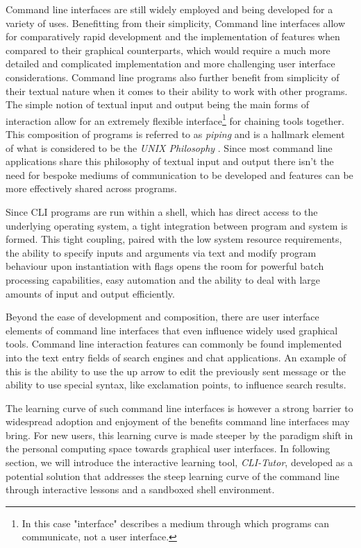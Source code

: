 Command line interfaces are still widely employed and being developed for a
variety of uses. Benefitting from their simplicity, Command line interfaces
allow for comparatively rapid development and the implementation of features
when compared to their graphical counterparts, which would require a much more
detailed and complicated implementation and more challenging user interface
considerations. Command line programs also further benefit from simplicity of
their textual nature when it comes to their ability to work with other
programs. The simple notion of textual input and output being the main forms of
interaction allow for an extremely flexible interface\footnote{In this case
	"interface" describes a medium through which programs can communicate, not
	a user interface.} for chaining tools together. This composition of programs is
referred to as \textit{piping} and is a hallmark element of what is considered to be the
\textit{UNIX Philosophy} \cite{mcilroy1978unix}. Since most command line
applications share this philosophy of textual input and output there isn't the
need for bespoke mediums of communication to be developed and features can be
more effectively shared across programs.

Since CLI programs are run within a shell, which has direct access to the
underlying operating system, a tight integration between program and system is
formed. This tight coupling, paired with the low system resource requirements,
the ability to specify inputs and arguments via text and modify program
behaviour upon instantiation with flags opens the room for powerful batch
processing capabilities, easy automation and the ability to deal with large
amounts of input and output efficiently.

Beyond the ease of development and composition, there are user interface
elements of command line interfaces that even influence widely used graphical
tools. Command line interaction features can commonly be found implemented into
the text entry fields of search engines \cite{norman2007breakthrough} and chat
applications. An example of this is the ability to use the up arrow to edit the
previously sent message or the ability to use special syntax, like exclamation
points, to influence search results.

The learning curve of such command line interfaces is however a strong barrier
to widespread adoption and enjoyment of the benefits command line interfaces
may bring. For new users, this learning curve is made steeper by the paradigm
shift in the personal computing space towards graphical user interfaces. In
following section, we will introduce the interactive learning tool,
\textit{CLI-Tutor}, developed as a potential solution that addresses the steep
learning curve of the command line through interactive lessons and a sandboxed
shell environment.


